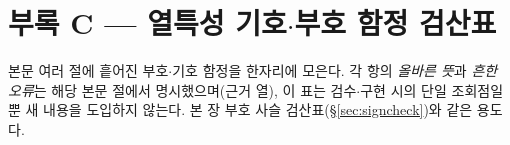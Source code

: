 \section*{부록 C --- 열특성 기호$\cdot$부호 함정 검산표}
\label{sec:traps-thermal}

본문 여러 절에 흩어진 부호$\cdot$기호 함정을 한자리에 모은다. 각 항의 \emph{올바른 뜻}과 \emph{흔한 오류}는
해당 본문 절에서 명시했으며(근거 열), 이 표는 검수$\cdot$구현 시의 단일 조회점일 뿐 새 내용을 도입하지 않는다.
본 장 부호 사슬 검산표(\S\ref{sec:signcheck})와 같은 용도다.

